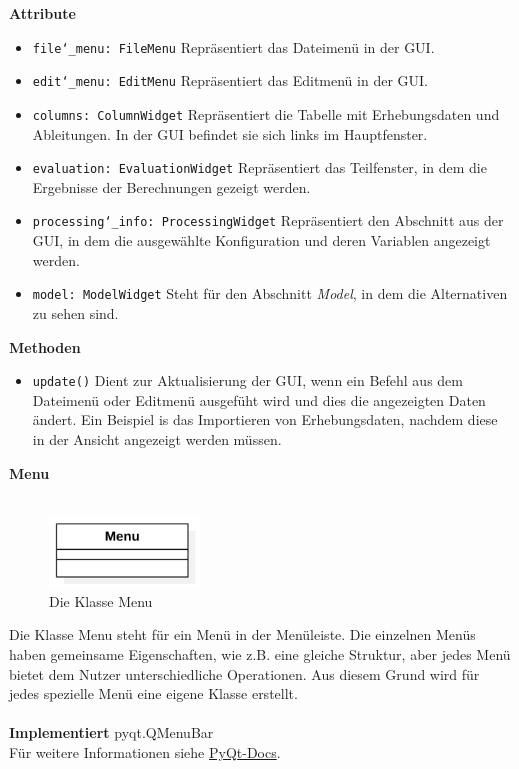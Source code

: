\documentclass{article}
\begin{document}
\textbf{{Attribute}}
\begin{itemize}
\item \texttt{file\char`_menu: FileMenu} \newline Repräsentiert das Dateimenü in der GUI.
\item \texttt{edit\char`_menu: EditMenu} \newline Repräsentiert das Editmenü in der GUI.
\item \texttt{columns: ColumnWidget} \newline Repräsentiert die Tabelle mit Erhebungsdaten und Ableitungen. In der GUI befindet sie sich links im Hauptfenster.
\item \texttt{evaluation: EvaluationWidget} \newline Repräsentiert das Teilfenster, in dem die Ergebnisse der Berechnungen gezeigt werden.
\item \texttt{processing\char`_info: ProcessingWidget} \newline Repräsentiert den Abschnitt aus der GUI, in dem die ausgewählte Konfiguration und deren Variablen angezeigt werden.
\item \texttt{model: ModelWidget} \newline Steht für den Abschnitt \textit{Model}, in dem die Alternativen zu sehen sind.
\end{itemize}

\textbf{{Methoden}}
\begin{itemize}
\item \texttt{update()} \newline Dient zur Aktualisierung der GUI, wenn ein Befehl aus dem Dateimenü oder Editmenü ausgefüht wird und dies die angezeigten Daten ändert. Ein Beispiel is das Importieren von Erhebungsdaten, nachdem diese in der Ansicht angezeigt werden müssen.
\end{itemize}

\newpage
\textbf{\large{Menu}}\\\\
\begin{figure}[H]%
    \centering
    \includegraphics[width=4cm]{entwurf/Entwurf_dokument/img/klassenView/Menu.png}
    \caption{Die Klasse Menu}
\end{figure}
Die Klasse Menu steht für ein Menü in der Menüleiste. Die einzelnen Menüs haben gemeinsame Eigenschaften, wie z.B. eine gleiche Struktur, aber jedes Menü bietet dem Nutzer unterschiedliche Operationen. Aus diesem Grund wird für jedes spezielle Menü eine eigene Klasse erstellt.
\\\\
\textbf{Implementiert} pyqt.QMenuBar\\ Für weitere Informationen siehe \href{https://doc.qt.io/qtforpython-5/PySide2/QtWidgets/QMenuBar.html}{PyQt-Docs}.
\newline \newline
\end{document}
